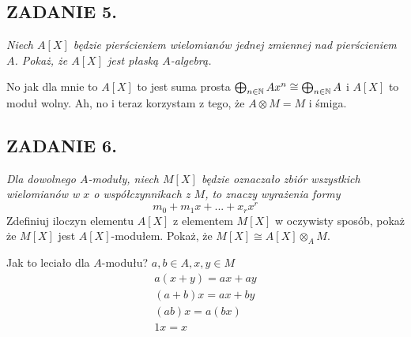 \documentclass{article}
\begin{document}
\subsection*{ZADANIE 5.}
\emph{\color{pink}Niech $A[X]$ będzie pierścieniem wielomianów jednej zmiennej nad pierścieniem $A$. Pokaż, że $A[X]$ jest płaską $A$-algebrą.}
\smallskip

No jak dla mnie to $A[X]$ to jest suma prosta $\bigoplus_{n\in\mathbb{N}}Ax^n\cong \bigoplus_{n\in\mathbb{N}}A$ i $A[X]$ to moduł wolny.
Ah, no i teraz korzystam z tego, że $A\otimes M=M$ i śmiga.


\subsection*{ZADANIE 6.}
{\color{yellow}\emph{Dla dowolnego $A$-moduły, niech $M[X]$ będzie oznaczało zbiór wszystkich wielomianów w $x$ o współczynnikach z $M$, to znaczy wyrażenia formy}
$$m_0+m_1x+...+x_rx^r$$
Zdefiniuj iloczyn elementu $A[X]$ z elementem $M[X]$ w oczywisty sposób, pokaż że $M[X]$ jest $A[X]$-modułem. Pokaż, że $M[X]\cong A[X]\otimes_AM$.}
\smallskip

Jak to leciało dla $A$-modułu? $a,b\in A, x,y\in M$
\begin{multline*}
    a(x+y)=ax+ay\\
    (a+b)x=ax+by\\
    (ab)x=a(bx)\\
    1x=x\\
\end{multline*}
\end{document}
